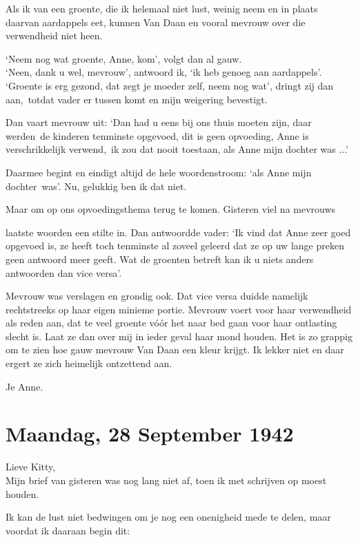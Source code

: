 \documentclass{book}
\begin{document}
Als ik van een groente, die ik helemaal niet lust, weinig neem en in plaats
daarvan aardappels eet, kunnen Van Daan en vooral mevrouw over die verwendheid
niet heen.

`Neem nog wat groente, Anne, kom', volgt dan al gauw.\\
`Neen, dank u wel,
mevrouw', antwoord ik, `ik heb genoeg aan aardappels'. `Groente is erg gezond,
dat zegt je moeder zelf, neem nog wat', dringt zij dan aan,~totdat vader er
tussen komt en mijn weigering bevestigt.

Dan vaart mevrouw uit: `Dan had u eens bij ons thuis moeten zijn, daar werden~de
kinderen tenminste opgevoed, dit is geen opvoeding, Anne is verschrikkelijk
verwend,~ik zou dat nooit toestaan, als Anne mijn dochter was ...'

Daarmee begint en eindigt altijd de hele woordenstroom: `als Anne mijn
dochter~was'. Nu, gelukkig ben ik dat niet.

Maar om op ons opvoedingsthema terug te komen. Gisteren viel na mevrouws

laatste woorden een stilte in. Dan antwoordde vader: `Ik vind dat Anne zeer goed
opgevoed is, ze heeft toch tenminste al zoveel geleerd dat ze op uw lange preken
geen antwoord meer geeft. Wat de groenten betreft kan ik u niets anders
antwoorden dan vice versa'.

Mevrouw was verslagen en grondig ook. Dat vice versa duidde namelijk
rechtstreeks op haar eigen minieme portie. Mevrouw voert voor haar verwendheid
als reden aan, dat te veel groente vóór het naar bed gaan voor haar ontlasting
slecht is. Laat ze dan over mij in ieder geval haar mond houden. Het is zo
grappig om te zien hoe gauw mevrouw Van Daan een kleur krijgt. Ik lekker niet en
daar ergert ze zich heimelijk ontzettend aan.

Je Anne.

\section*{Maandag, 28 September 1942}

Lieve Kitty,\\
Mijn brief van gisteren was nog lang niet af, toen ik met
schrijven op moest houden.

Ik kan de lust niet bedwingen om je nog een onenigheid mede te delen, maar
voordat ik daaraan begin dit:
\end{document}
